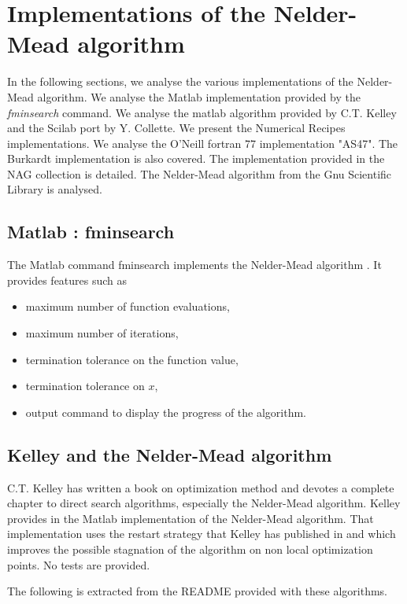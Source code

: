 \chapter{Implementations of the Nelder-Mead algorithm}

In the following sections, we analyse the various implementations of the 
Nelder-Mead algorithm. We analyse the Matlab implementation provided 
by the \emph{fminsearch} command. We analyse the matlab algorithm provided by 
C.T. Kelley and the Scilab port by Y. Collette. We 
present the Numerical Recipes implementations. We analyse the O'Neill 
fortran 77 implementation "AS47". The Burkardt implementation is also covered.
The implementation provided in the NAG collection is detailed.
The Nelder-Mead algorithm from the Gnu Scientific Library is analysed.

\section{Matlab : fminsearch}

The Matlab command fminsearch implements the Nelder-Mead algorithm \cite{MatlabFminsearch}. 
It provides features such as 
\begin{itemize}
\item maximum number of function evaluations,
\item maximum number of iterations,
\item termination tolerance on the function value,
\item termination tolerance on $x$,
\item output command to display the progress of the algorithm.
\end{itemize}

\section{Kelley and the Nelder-Mead algorithm}

C.T. Kelley has written a book \cite{Kelley1999} on optimization method and devotes a 
complete chapter to direct search algorithms, especially the Nelder-Mead 
algorithm. Kelley provides in \cite{KelleyMethodsOptimizationMatlabCodes} 
the Matlab implementation of the 
Nelder-Mead algorithm. That implementation uses the restart strategy 
that Kelley has published in \cite{589283} and which improves the possible 
stagnation of the algorithm on non local optimization points. No tests 
are provided.

The following is extracted from the README provided with these 
algorithms. 

